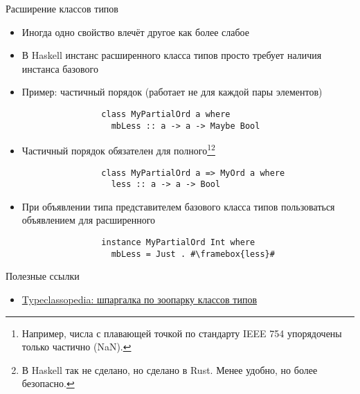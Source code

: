     \begin{frame}[fragile]{Расширение классов типов}
        \begin{itemize}
            \item Иногда одно свойство влечёт другое как более слабое
            \item В Haskell инстанс расширенного класса типов  просто требует наличия инстанса базового
            \item Пример: частичный порядок (работает не для каждой пары элементов)
            \begin{verbatim}
                class MyPartialOrd a where
                  mbLess :: a -> a -> Maybe Bool
            \end{verbatim}
            \item Частичный порядок обязателен для полного\footnote{Например, числа с плавающей точкой по стандарту IEEE 754 упорядочены только частично (NaN).}\footnote{В Haskell так не сделано, но сделано в Rust. Менее удобно, но более безопасно.}
            \begin{verbatim}
                class MyPartialOrd a => MyOrd a where
                  less :: a -> a -> Bool
            \end{verbatim}
            \item При объявлении типа представителем базового класса типов пользоваться объявлением для расширенного
            \begin{verbatim}
                instance MyPartialOrd Int where
                  mbLess = Just . #\framebox{less}#
            \end{verbatim}
        \end{itemize}
    \end{frame}


    \begin{frame}{Полезные ссылки}
        \begin{itemize}
            \item \href{https://wiki.haskell.org/Typeclassopedia}{\color{blue} Typeclassopedia: шпаргалка по зоопарку классов типов}
        \end{itemize}
    \end{frame}

